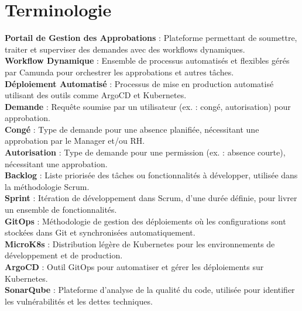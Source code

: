 \chapter*{Terminologie}


\textbf{Portail de Gestion des Approbations} : Plateforme permettant de soumettre, traiter et superviser des demandes avec des workflows dynamiques.
\\

\textbf{Workflow Dynamique} : Ensemble de processus automatisés et flexibles gérés par Camunda pour orchestrer les approbations et autres tâches.
\\

\textbf{Déploiement Automatisé} : Processus de mise en production automatisé utilisant des outils comme ArgoCD et Kubernetes.
\\

\textbf{Demande} : Requête soumise par un utilisateur (ex. : congé, autorisation) pour approbation.
\\

\textbf{Congé} : Type de demande pour une absence planifiée, nécessitant une approbation par le Manager et/ou RH.
\\

\textbf{Autorisation} : Type de demande pour une permission (ex. : absence courte), nécessitant une approbation.
\\

\textbf{Backlog} : Liste priorisée des tâches ou fonctionnalités à développer, utilisée dans la méthodologie Scrum.
\\

\textbf{Sprint} : Itération de développement dans Scrum, d’une durée définie, pour livrer un ensemble de fonctionnalités.
\\

\textbf{GitOps} : Méthodologie de gestion des déploiements où les configurations sont stockées dans Git et synchronisées automatiquement.
\\

\textbf{MicroK8s} : Distribution légère de Kubernetes pour les environnements de développement et de production.
\\

\textbf{ArgoCD} : Outil GitOps pour automatiser et gérer les déploiements sur Kubernetes.
\\

\textbf{SonarQube} : Plateforme d’analyse de la qualité du code, utilisée pour identifier les vulnérabilités et les dettes techniques.
\\
 
 
